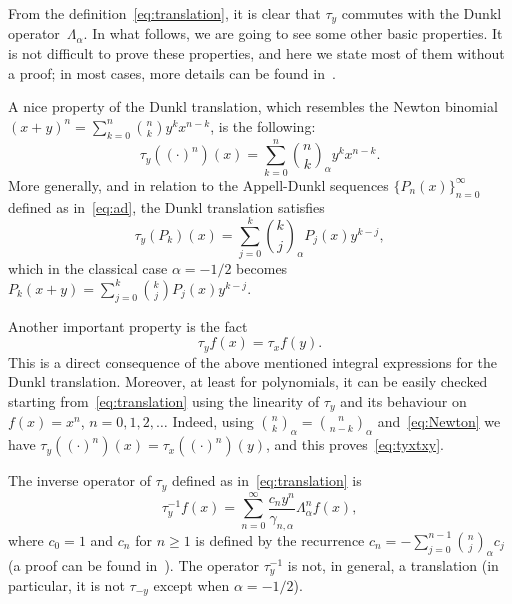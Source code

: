 \documentclass[a4paper]{amsart}
\newcommand{\cc}{\gamma}
\newcommand{\La}{\Lambda_{\alpha}}
\newcommand{\binoma}[2]{\binom{#1}{#2}_{\!\alpha}}
\theoremstyle{plain}
\theoremstyle{definition}
\theoremstyle{remark}
\numberwithin{equation}{section}
\begin{document}
From the definition~\eqref{eq:translation}, it is clear that $\tau_y$ commutes with the Dunkl operator~$\La$.
In what follows, we are going to see some other basic properties.
It is not difficult to prove these properties, and here we state most of them without a proof; in most cases, more details can be found in~\cite{CMV}.

A nice property of the Dunkl translation, which resembles the Newton binomial $(x+y)^n = \sum_{k=0}^n \binom{n}{k} y^k x^{n-k}$, is the following:
\begin{equation}
\label{eq:Newton}
  \tau_y ((\cdot)^n)(x) = 
  \sum_{k=0}^n \binoma{n}{k} y^k x^{n-k}.
\end{equation}
More generally, and in relation to the Appell-Dunkl sequences $\{P_n(x)\}_{n=0}^{\infty}$ defined as in~\eqref{eq:ad}, the Dunkl translation satisfies 
\begin{equation*}
  \tau_y(P_k)(x)
  = \sum_{j=0}^k \binoma{k}{j} P_j(x) y^{k-j},
\end{equation*}
which in the classical case $\alpha=-1/2$ becomes $P_k(x+y) = \sum_{j=0}^k \binom{k}{j} P_j(x) y^{k-j}$.

Another important property is the fact
\begin{equation}
\label{eq:tyxtxy}
  \tau_y f(x) = \tau_x f(y).
\end{equation}
This is a direct consequence of the above mentioned integral expressions for the Dunkl translation. 
Moreover, at least for polynomials, it can be easily checked starting from~\eqref{eq:translation} using the linearity of $\tau_y$ and its behaviour on $f(x) = x^n$, $n=0,1,2,\dots$ Indeed, using $\binoma{n}{k} = \binoma{n}{n-k}$ and~\eqref{eq:Newton} we have $\tau_y ((\cdot)^n)(x) = \tau_x ((\cdot)^n)(y)$, and this proves~\eqref{eq:tyxtxy}.


The inverse operator of $\tau_y$ defined as in~\eqref{eq:translation} is 
\begin{equation}
\label{eq:tau-inv}
  \tau_y^{-1} f(x) = \sum_{n=0}^\infty \frac{c_n y^n}{\cc_{n,\alpha}}\La^{n}f(x),
\end{equation}
where $c_0 = 1$ and $c_n$ for $n\ge1$ is defined by the recurrence $c_n = -\sum_{j=0}^{n-1} \binoma{n}{j} c_j$ (a proof can be found in~\cite[Lemma~4.4]{CMV}). The operator $\tau_y^{-1}$ is not, in general, a translation (in particular, it is not $\tau_{-y}$ except when $\alpha=-1/2$).
\end{document}
